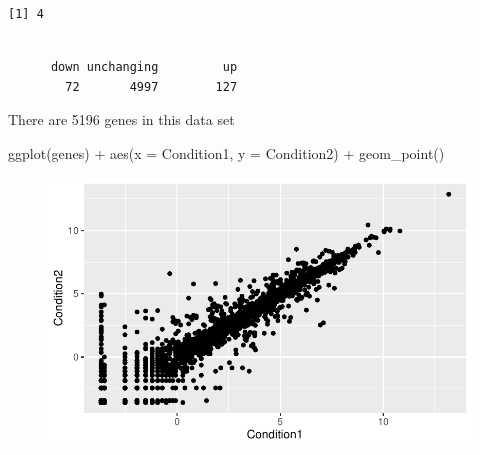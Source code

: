 \documentclass[
  letterpaper,
  DIV=11,
  numbers=noendperiod]{scrartcl}
\newenvironment{Shaded}{\begin{snugshade}}{\end{snugshade}}
\newcommand{\AttributeTok}[1]{\textcolor[rgb]{0.40,0.45,0.13}{#1}}
\newcommand{\FunctionTok}[1]{\textcolor[rgb]{0.28,0.35,0.67}{#1}}
\newcommand{\NormalTok}[1]{\textcolor[rgb]{0.00,0.23,0.31}{#1}}
\newcommand{\SpecialCharTok}[1]{\textcolor[rgb]{0.37,0.37,0.37}{#1}}
\begin{document}
\begin{verbatim}
[1] 4
\end{verbatim}

\begin{Shaded}
\end{Shaded}

\begin{verbatim}

      down unchanging         up 
        72       4997        127 
\end{verbatim}

There are 5196 genes in this data set

\begin{Shaded}
\begin{Highlighting}[]
\FunctionTok{ggplot}\NormalTok{(genes) }\SpecialCharTok{+}
  \FunctionTok{aes}\NormalTok{(}\AttributeTok{x =}\NormalTok{ Condition1, }\AttributeTok{y =}\NormalTok{ Condition2) }\SpecialCharTok{+}
  \FunctionTok{geom\_point}\NormalTok{()}
\end{Highlighting}
\end{Shaded}

\begin{figure}[H]

{\centering \includegraphics{class5_lab_bggn_files/figure-pdf/unnamed-chunk-8-1.pdf}

}

\end{figure}
\end{document}
